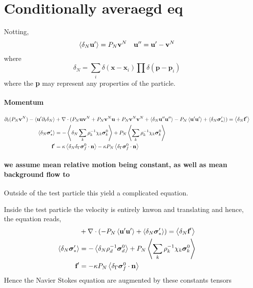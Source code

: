 \documentclass[12pt]{My_preprint}
\begin{document}
\section{Conditionally averaegd eq}
Notting,
\begin{align}
    \left<\delta_N \textbf{u}'\right> = P_N \textbf{v}^N 
     && \textbf{u}'' = \textbf{u}' - \textbf{v}^N
\end{align}
where 
\begin{equation}
    \delta_N = \sum_i \delta(\textbf{x}- \textbf{x}_i) \prod \delta(\textbf{p}-\textbf{p}_i)
\end{equation}
where the \textbf{p} may represent any properties of the particle. 
\paragraph{Momentum }
\begin{align}
    \partial_t (P_N \textbf{v}^N) 
    - \left<\textbf{u}'\partial_t \delta_N\right>
    &+ \mathbf{\nabla}\cdot (
          P_N \textbf{u}\textbf{v}^N
        + P_N \textbf{v}^N \textbf{u}
        + P_N \textbf{v}^N \textbf{v}^N
        + \left<\delta_N \textbf{u}''\textbf{u}''\right>
        - P_N \left<\textbf{u}'\textbf{u}'\right>
        + \left<\delta_N \bm\sigma_*'\right> )
    = \left<\delta_N \textbf{f}'\right>\\
    \left<\delta_N\bm\sigma_*'\right>
    &=
    -\left<\delta_N\sum_k \rho^{-1}_k \chi_k \bm\sigma_k^0\right>
    + P_N  \left<\sum_k \rho^{-1}_k \chi_k \bm\sigma_k^0  \right>\\
    \textbf{f}'
    &=
    \kappa \left<\delta_N\delta_{\Gamma}  \bm\sigma_f^0 \cdot \textbf{n}\right>
    - \kappa P_N \left<\delta_{\Gamma}  \bm\sigma_f^0 \cdot \textbf{n}\right>
    \\
\end{align}

\paragraph{we assume mean relative motion being constant, as well as mean background flow to}
Outside of the test particle this yield a complicated equation. 

Inside the test particle the velocity is entirely knwon and translating and hence, the equation reads, 
\begin{align}
    &+ \mathbf{\nabla}\cdot (
        - P_N \left<\textbf{u}'\textbf{u}'\right>
        + \left<\delta_N \bm\sigma_*'\right> )
    = \left<\delta_N \textbf{f}'\right>\\
    \left<\delta_N\bm\sigma_*'\right>
    &=
    -\left<\delta_N  \rho^{-1}_d \bm\sigma_d^0\right>
    + P_N  \left<\sum_k \rho^{-1}_k \chi_k \bm\sigma_k^0  \right>\\
    \textbf{f}'
    &=
    - \kappa P_N \left<\delta_{\Gamma}  \bm\sigma_f^0 \cdot \textbf{n}\right>
    \\
\end{align}
Hence the Navier Stokes equation are augmented by these constants tensors
\end{document}

